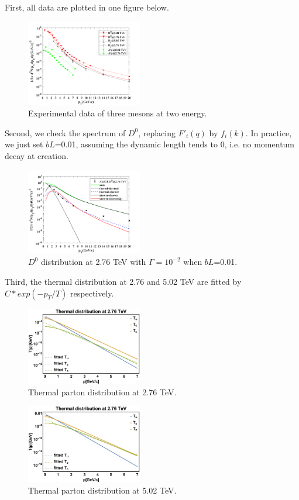 \documentclass[twocolumn,aps,superscriptaddress,nofootinbib,floatfix]{revtex4}
\begin{document}
First, all data are plotted in one figure below.
\begin{figure}[H]
	\includegraphics[width=0.45\textwidth]{all_data.png}
	\caption{Experimental data of three mesons at two energy. }
	\label{fig65}
\end{figure}
Second, we check the spectrum of $D^0$, replacing $F'_i(q)$ by $f_i(k)$. In practice, we just set $bL$=0.01, assuming the dynamic length tends to 0, i.e. no momentum decay at creation.
\begin{figure}[H]
	\includegraphics[width=0.45\textwidth]{change_F1iq_to_fik.png}
	\caption{$D^0$ distribution at 2.76 TeV with $\Gamma=10^{-2}$ when $bL$=0.01. }
	\label{fig66}
\end{figure}
Third, the thermal distribution at 2.76 and 5.02 TeV are fitted by $C*exp(-p_T/T)$ respectively.
\begin{figure}[H]
	\includegraphics[width=0.45\textwidth]{Thermal276.png}
	\caption{Thermal parton distribution at 2.76 TeV. }
	\label{fig67}
\end{figure}
\begin{figure}[H]
	\includegraphics[width=0.45\textwidth]{Thermal502.png}
	\caption{Thermal parton distribution at 5.02 TeV. }
	\label{fig68}
\end{figure}
\end{document}
